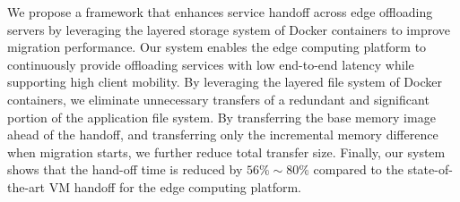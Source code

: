 We propose a framework that enhances service handoff across edge offloading servers by leveraging the layered storage system of Docker containers to improve migration performance.
Our system enables the edge computing platform to continuously provide offloading services with low end-to-end latency while supporting high client mobility. 
By leveraging the layered file system of Docker containers, we eliminate unnecessary transfers of a redundant and significant portion of the application file system. 
By transferring the base memory image ahead of the handoff, and transferring only the incremental memory difference when migration starts, we further reduce total transfer size. Finally, our system shows that the hand-off time is reduced by $56\%\sim 80\%$ compared to the state-of-the-art VM handoff for the edge computing platform.



